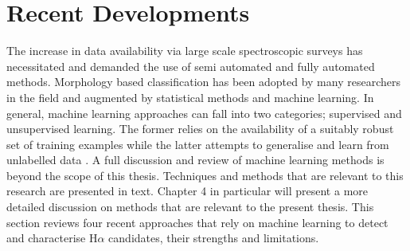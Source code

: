 \section{Recent Developments}

The increase in data availability via large scale spectroscopic surveys has necessitated and demanded the use of semi automated and fully automated methods. Morphology based classification has been adopted by many researchers in the field and augmented by statistical methods and machine learning. In general, machine learning approaches can fall into two categories; supervised and unsupervised learning. The former relies on the availability of a suitably robust set of training examples while the latter attempts to generalise and learn from unlabelled data \cite{hastie2009elements}. A full discussion and review of machine learning methods is beyond the scope of this thesis. Techniques and methods that are relevant to this research are presented in text. Chapter 4 in particular will present a more detailed discussion on methods that are relevant to the present thesis. This section reviews four recent approaches that rely on machine learning to detect and characterise H$\alpha$ candidates, their strengths and limitations. 



